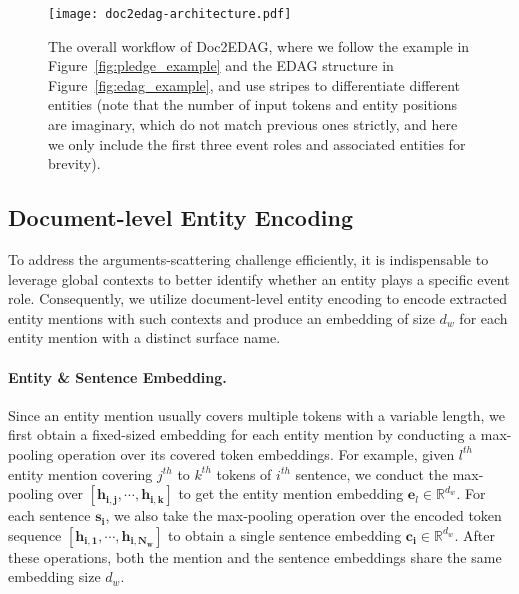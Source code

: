 \documentclass[11pt,a4paper]{article}
\newcommand{\R}{{\mathbb{R}}}
\begin{document}
\begin{figure*}[ht]
\centering
\texttt{[image: doc2edag-architecture.pdf]}
\caption{The overall workflow of Doc2EDAG, where we follow the example in Figure~\ref{fig:pledge_example} and the EDAG structure in Figure~\ref{fig:edag_example}, and use stripes to differentiate different entities (note that the number of input tokens and entity positions are imaginary, which do not match previous ones strictly, and here we only include the first three event roles and associated entities for brevity).}
\label{fig:architecture}
\end{figure*}


\subsection{Document-level Entity Encoding}
\label{sec:doc_ent_enc}
To address the arguments-scattering challenge efficiently,
it is indispensable to leverage global contexts to better identify whether an entity plays a specific event role.
Consequently, we utilize document-level entity encoding to encode extracted entity mentions with such contexts and produce an embedding of size $d_w$ for each entity mention with a distinct surface name.

\paragraph{Entity \& Sentence Embedding.}
Since an entity mention usually covers multiple tokens with a variable length,
we first obtain a fixed-sized embedding for each entity mention by conducting a max-pooling operation over its covered token embeddings.
For example, given $l^{th}$ entity mention covering $j^{th}$ to $k^{th}$ tokens of $i^{th}$ sentence, we conduct the max-pooling over $[\bm{h_{i,j}},\cdots,\bm{h_{i,k}}]$ to get the entity mention embedding $\bm{e}_l \in \R^{d_w}$.
For each sentence $\bm{s_i}$, we also take the max-pooling operation over the encoded token sequence $[\bm{h_{i,1}},\cdots,\bm{h_{i,N_w}}]$ to obtain a single sentence embedding $\bm{c_i} \in \R^{d_w}$.
After these operations, both the mention and the sentence embeddings share the same embedding size $d_w$.
\end{document}
